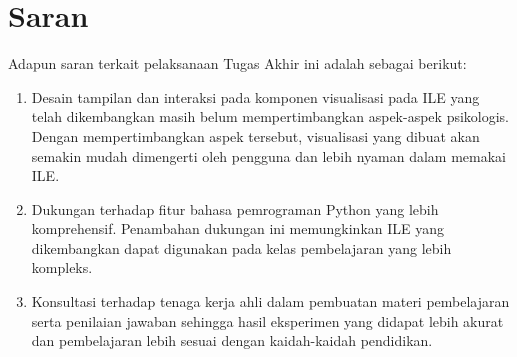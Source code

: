 \section{Saran}
Adapun saran terkait pelaksanaan Tugas Akhir ini adalah sebagai berikut:
\begin{enumerate}
  \item Desain tampilan dan interaksi pada komponen visualisasi pada ILE yang telah dikembangkan masih belum mempertimbangkan aspek-aspek psikologis. Dengan mempertimbangkan aspek tersebut, visualisasi yang dibuat akan semakin mudah dimengerti oleh pengguna dan lebih nyaman dalam memakai ILE.
  \item Dukungan terhadap fitur bahasa pemrograman Python yang lebih komprehensif. Penambahan dukungan ini memungkinkan ILE yang dikembangkan dapat digunakan pada kelas pembelajaran yang lebih kompleks.
  \item Konsultasi terhadap tenaga kerja ahli dalam pembuatan materi pembelajaran serta penilaian jawaban sehingga hasil eksperimen yang didapat lebih akurat dan pembelajaran lebih sesuai dengan kaidah-kaidah pendidikan.
\end{enumerate}